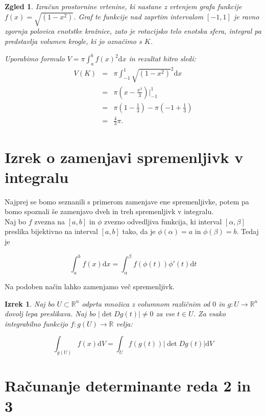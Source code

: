 \documentclass[12pt, a4paper]{article}
\newtheorem{izrek}{Izrek}
\newtheorem{zgled}{Zgled}
\begin{document}
\begin{zgled} 
Izračun prostornine vrtenine, ki nastane z vrtenjem grafa funkcije $f(x)=\sqrt{(1-x^2)}$. Graf te funkcije nad zaprtim intervalom $[-1,1]$ je ravno zgornja polovica enotstke krožnice, zato je rotacijsko telo enotska sfera, integral pa predstavlja volumen krogle, ki jo označimo s $K$.

Uporabimo formulo $V=\pi \int_{a}^b{f(x)}^2\mathrm{d} x $ in rezultat hitro sledi:
\begin{eqnarray*}
V(K)&=&\pi \int_{-1}^1{{\sqrt{(1-x^2)}}}^2\mathrm{d} x \\
&=&\pi(x-\frac{x^3}{3})\big|_{-1}^1 \\
&=& \pi (1-\frac{1}{3})-\pi (-1+\frac{1}{3}) \\
&=&\frac{4}{3}\pi.
\end{eqnarray*}
\end{zgled}


\section{Izrek o zamenjavi spremenljivk v integralu}
Najprej se bomo seznanili s primerom zamenjave ene spremenljivke, potem pa bomo spoznali še zamenjavo dveh in treh spremenljivk v integralu.
\\
Naj bo $f$ zvezna na $[a,b]$ in $\phi$ zvezno odvedljiva funkcija, ki interval $[\alpha,\beta]$ preslika bijektivno na interval $[a,b]$ tako, da je  $\phi(\alpha)=a$ in $\phi(\beta)=b$. Tedaj je

$$\int_{a}^bf(x)\mathrm{d} x=\int_{\alpha}^{\beta}f(\phi(t))\phi'(t)\mathrm{d} t$$

Na podoben način lahko zamenjamo več spremenljivk. 
\begin{izrek}
Naj bo $U \subset \mathbb{R}^n$ odprta množica z volumnom različnim od $0$ in $g:U \rightarrow \mathbb{R}^n$ dovolj lepa preslikava. Naj bo $\big | \det Dg(t) \big |\neq 0$ za vse $t \in U$. Za vsako integrabilno funkcijo $f:g(U) \rightarrow \mathbb{R}$ velja:

$$\int_{g(U)}^{}f(x) \mathrm{d} V=\int_{U}^{}f(g(t)) \big |\det Dg(t) \big | \mathrm{d} V$$
\end{izrek}


\section{Računanje determinante reda 2 in 3}
\end{document}
